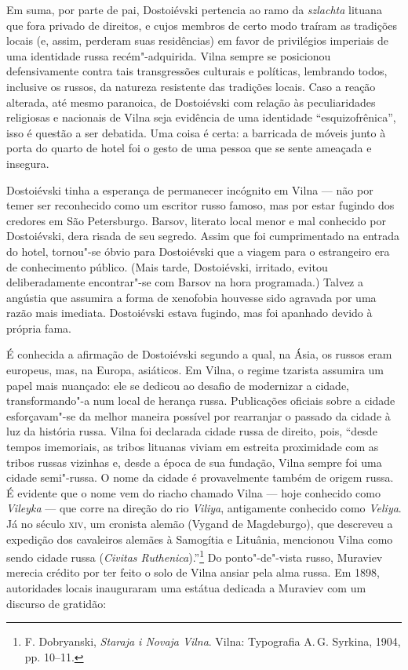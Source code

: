 Em suma, por parte de pai, Dostoiévski pertencia ao ramo da
\textit{szlachta} lituana que fora privado de direitos, e cujos membros de
certo modo traíram as tradições locais (e, assim, perderam suas
residências) em favor de privilégios imperiais de uma identidade russa
recém"-adquirida. Vilna sempre se posicionou defensivamente contra tais
transgressões culturais e políticas, lembrando todos, inclusive os
russos, da natureza resistente das tradições locais. Caso a reação
alterada, até mesmo paranoica, de Dostoiévski com relação às
peculiaridades religiosas e nacionais de Vilna seja evidência de uma
identidade ``esquizofrênica'', isso é questão a ser debatida. Uma coisa
é certa: a barricada de móveis junto à porta do quarto de hotel foi o
gesto de uma pessoa que se sente ameaçada e insegura.

Dostoiévski tinha a esperança de permanecer incógnito em Vilna --- não por
temer ser reconhecido como um escritor russo famoso, mas por estar
fugindo dos credores em São Petersburgo. Barsov, literato local menor e
mal conhecido por Dostoiévski, dera risada de seu segredo. Assim que foi
cumprimentado na entrada do hotel, tornou"-se óbvio para Dostoiévski que
a viagem para o estrangeiro era de conhecimento público. (Mais tarde,
Dostoiévski, irritado, evitou deliberadamente encontrar"-se com Barsov na
hora programada.) Talvez a angústia que assumira a forma de xenofobia
houvesse sido agravada por uma razão mais imediata. Dostoiévski estava
fugindo, mas foi apanhado devido à própria fama.

\asterisc

É conhecida a afirmação de Dostoiévski segundo a qual, na Ásia, os
russos eram europeus, mas, na Europa, asiáticos. Em Vilna, o regime
tzarista assumira um papel mais nuançado: ele se dedicou ao desafio de
modernizar a cidade, transformando"-a num local de herança russa.
Publicações oficiais sobre a cidade esforçavam"-se da melhor maneira
possível por rearranjar o passado da cidade à luz da história russa.
Vilna foi declarada cidade russa de direito, pois, ``desde tempos
imemoriais, as tribos lituanas viviam em estreita proximidade com as
tribos russas vizinhas e, desde a época de sua fundação, Vilna sempre
foi uma cidade semi"-russa. O nome da cidade é provavelmente também de
origem russa. É evidente que o nome vem do riacho chamado Vilna --- hoje
conhecido como \textit{Vileyka} --- que corre na direção do rio
\textit{Viliya}, antigamente conhecido como \textit{Veliya}. Já no século
\textsc{xiv}, um cronista alemão (Vygand de Magdeburgo), que descreveu a expedição
dos cavaleiros alemães à Samogítia e Lituânia, mencionou Vilna como
sendo cidade russa (\textit{Civitas Ruthenica}).''\footnote{F. Dobryanski, \textit{Staraja i Novaja Vilna}. Vilna: Typografia A.\,G. Syrkina, 1904, pp. 10--11.}
Do ponto"-de"-vista russo, Muraviev merecia crédito por ter feito o solo
de Vilna ansiar pela alma russa. Em 1898, autoridades locais inauguraram
uma estátua dedicada a Muraviev com um discurso de gratidão:

